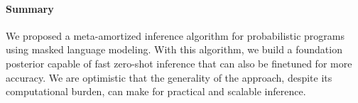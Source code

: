 \paragraph{Summary} We proposed a meta-amortized inference algorithm for probabilistic programs using masked language modeling. With this algorithm, we build a foundation posterior capable of fast zero-shot inference that can also be finetuned for more accuracy.
We are optimistic that the generality of the approach, despite its computational burden, can make for practical and scalable inference.
